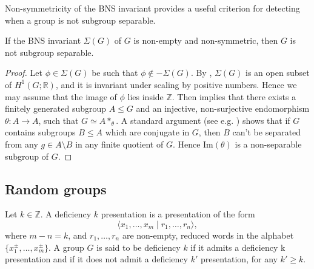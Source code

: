 Non-symmetricity of the BNS invariant provides a useful criterion for detecting when a group is not subgroup separable. 

\begin{lemma}\label{separability}
If the BNS invariant $\Sigma(G)$ of $G$ is non-empty and non-symmetric, then $G$ is not subgroup separable. 
\end{lemma}

\begin{proof}
Let $\phi \in \Sigma(G)$ be such that $ \phi \not \in -\Sigma(G)$. By \cite[Theorem A]{BNS}, $\Sigma(G)$ is an open subset of  $H^1(G ; \mathbb{R})$, and it is invariant under scaling by positive numbers. Hence we may assume that the image of $\phi$ lies inside $\mathbb{Z}$. Then \cite[Proposition~4.1]{BNS} implies that there exists a finitely generated subgroup $A \leq G$ and an injective, non-surjective endomorphism $\theta \colon A \to A$, such that $G \simeq A \ast_{\theta}$. A standard argument (see e.g. \cite[Proposition 4]{LNW}) shows that if $G$ contains subgroups $B \leq A$ which are conjugate in $G$, then $B$ can't be separated from any $g\in A \setminus B$ in any finite quotient of $G$. Hence $\mathrm{Im}(\theta)$ is a non-separable subgroup of $G$.
\end{proof}

\subsection{Random groups}

Let $k \in \mathbb{Z}$. A deficiency $k$ presentation is a presentation of the form 
\[\langle x_1, \ldots, x_{m} \mid r_1, \ldots, r_n \rangle,\] where $m -n = k$, and $r_1, \ldots, r_n$ are non-empty, reduced words in the alphabet $\{x_1^{\pm}, \ldots, x_m^{\pm}\}$. A group $G$ is said to be deficiency $k$ if it admits a deficiency k presentation and if it does not admit a deficiency $k'$ presentation, for any $k' \geq k$. 


